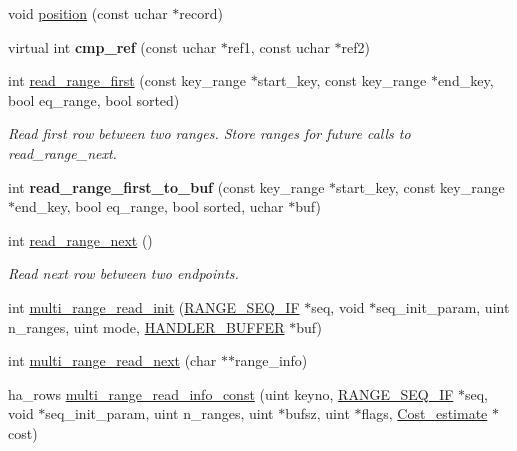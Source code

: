 \begin{DoxyCompactItemize}
\item 
void \mbox{\hyperlink{classha__ndbcluster_ae47b8413b29048108a6ee92af729ea46}{position}} (const uchar $\ast$record)
\item 
\mbox{\label{classha__ndbcluster_a8fe58d670113d290892c21acb52f9aa5}} 
virtual int {\bfseries cmp\+\_\+ref} (const uchar $\ast$ref1, const uchar $\ast$ref2)
\item 
int \mbox{\hyperlink{classha__ndbcluster_a4ebf9b2b84870f08b62e5e3f5465aae8}{read\+\_\+range\+\_\+first}} (const key\+\_\+range $\ast$start\+\_\+key, const key\+\_\+range $\ast$end\+\_\+key, bool eq\+\_\+range, bool sorted)
\begin{DoxyCompactList}\small\item\em Read first row between two ranges. Store ranges for future calls to read\+\_\+range\+\_\+next. \end{DoxyCompactList}\item 
\mbox{\label{classha__ndbcluster_a99cfd1df9bc17dc77186affe8fdd0718}} 
int {\bfseries read\+\_\+range\+\_\+first\+\_\+to\+\_\+buf} (const key\+\_\+range $\ast$start\+\_\+key, const key\+\_\+range $\ast$end\+\_\+key, bool eq\+\_\+range, bool sorted, uchar $\ast$buf)
\item 
int \mbox{\hyperlink{classha__ndbcluster_ac4ca12e4aa287eaf6a50c43219a1c776}{read\+\_\+range\+\_\+next}} ()
\begin{DoxyCompactList}\small\item\em Read next row between two endpoints. \end{DoxyCompactList}\item 
int \mbox{\hyperlink{classha__ndbcluster_aba9c67b0e6bdfc66f40e30b0bccecabf}{multi\+\_\+range\+\_\+read\+\_\+init}} (\mbox{\hyperlink{structst__range__seq__if}{R\+A\+N\+G\+E\+\_\+\+S\+E\+Q\+\_\+\+IF}} $\ast$seq, void $\ast$seq\+\_\+init\+\_\+param, uint n\+\_\+ranges, uint mode, \mbox{\hyperlink{structst__handler__buffer}{H\+A\+N\+D\+L\+E\+R\+\_\+\+B\+U\+F\+F\+ER}} $\ast$buf)
\item 
int \mbox{\hyperlink{classha__ndbcluster_a63ab7aa4c5bedaae4a2edb452da67fc8}{multi\+\_\+range\+\_\+read\+\_\+next}} (char $\ast$$\ast$range\+\_\+info)
\item 
ha\+\_\+rows \mbox{\hyperlink{classha__ndbcluster_abc8e0c56a5a9150ece910a132a05e826}{multi\+\_\+range\+\_\+read\+\_\+info\+\_\+const}} (uint keyno, \mbox{\hyperlink{structst__range__seq__if}{R\+A\+N\+G\+E\+\_\+\+S\+E\+Q\+\_\+\+IF}} $\ast$seq, void $\ast$seq\+\_\+init\+\_\+param, uint n\+\_\+ranges, uint $\ast$bufsz, uint $\ast$flags, \mbox{\hyperlink{classCost__estimate}{Cost\+\_\+estimate}} $\ast$cost)
$$
\end{DoxyCompactItemize}
